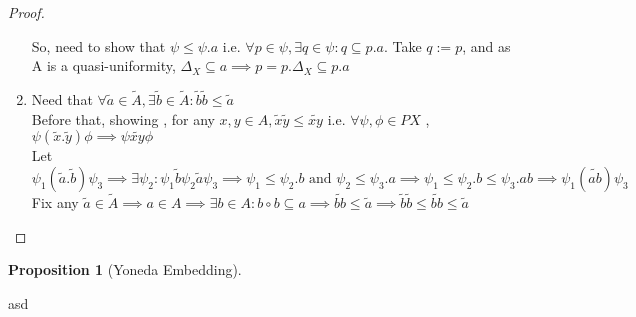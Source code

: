 \documentclass[18pt,a4paper]{article}
\theoremstyle{definition}
\newtheorem{proop}{Proposition}[section]
\begin{document}
\begin{proof}
\begin{enumerate}[label=(\roman*)]
		So, need to show that $\psi \leq \psi.a$ i.e. $\forall p\in \psi, \exists q\in \psi:
		q \subseteq p.a$. Take $q:=p$, and as A is a quasi-uniformity,
		$\Delta_X \subseteq a \implies p=p.\Delta_X \subseteq p.a$
	\item Need that $\forall \tilde{a} \in \tilde{A} , \exists \tilde{b}\in \tilde{A}:
		\tilde{b}\tilde{b} \leq \tilde{a} $\\
		Before that, showing , for any $x,y \in A, \tilde{x} \tilde{y} \leq \widetilde{xy} $
		i.e. $\forall \psi, \phi \in PX$ , $\psi(\tilde{x}.\tilde{y})\phi \implies
		\psi \widetilde{xy} \phi $\\
		Let $\psi_1(\tilde{a} .\tilde{b} )\psi_3 \implies \exists \psi_2:
		\psi_1 \tilde{b} \psi_2 \tilde{a} \psi_3 \implies
		\psi_1 \leq \psi_2.b \text{ and } \psi_2 \leq \psi_3.a
		\implies \psi_1 \leq \psi_2.b \leq \psi_3.ab \implies \psi_1(\widetilde{ab})\psi_3$
		\\
		Fix any $\tilde{a}\in \tilde{A} \implies a\in A \implies \exists b \in A: b \circ b \subseteq
		a \implies \widetilde{bb} \leq \tilde{a} \implies \tilde{b} \tilde{b} \leq
		\widetilde{bb} \leq \tilde{a}  $

\end{enumerate}
\end{proof}

\begin{proop}[Yoneda Embedding]

\end{proop}






\newpage
asd
\end{document}
